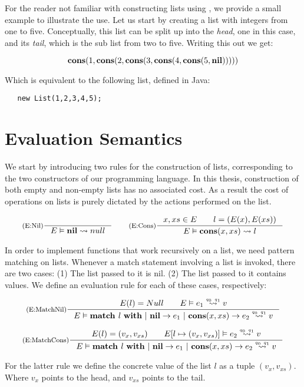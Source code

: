 For the reader not familiar with constructing lists using , we provide a small example to illustrate the use. Let us start by creating a list with integers from one to five. Conceptually, this list can be split up into the \emph{head}, one in this case, and its \emph{tail}, which is the sub list from two to five. Writing this out we get:

\[
   \textbf{cons}(1, \textbf{cons}(2, \textbf{cons}(3, \textbf{cons}(4, \textbf{cons}(5, \textbf{nil})))))
\]

Which is equivalent to the following list, defined in Java:

\begin{verbatim}
   new List(1,2,3,4,5);
\end{verbatim}

\section{Evaluation Semantics}

We start by introducing two rules for the construction of lists, corresponding to the two constructors of our programming language. In this thesis, construction of both empty and non-empty lists has no associated cost. As a result the cost of operations on lists is purely dictated by the actions performed on the list. 

\[
   \inference[(E:Nil)]
   {}
   {\evals{E}{\listnil}{null}{}{}}
   \qquad
   \inference[(E:Cons)]
   {\contains{E}{x, xs} \qquad l = (E(x), E(xs))}
   {\evals{E}{\cons{x}{xs}}{l}{}{}}
\]

In order to implement functions that work recursively on a list, we need pattern matching on lists. Whenever a match statement involving a list is invoked, there are two cases: (1) The list passed to it is nil. (2) The list passed to it contains values. We define an evaluation rule for each of these cases, respectively:

\[
   \inference[(E:MatchNil)]
   {E(l) = Null \qquad \evals{E}{e_1}{v}{q_0}{q_1}}
   {\evals{E}{\listmatch{l}{e_1}{e_2}}{v}{q_0}{q_1}}
\]

\[
   \inference[(E:MatchCons)]
   {E(l) = (v_x, v_{xs}) \qquad \evals{\envaugment{E}{l}{(v_x, v_{xs})}}{e_2}{v}{q_0}{q_1}}
   {\evals{E}{\listmatch{l}{e_1}{e_2}}{v}{q_0}{q_1}}
\]

For the latter rule we define the concrete value of the list \(l\) as a tuple \((v_x, v_{xs})\). Where \(v_x\) points to the head, and \(v_{xs}\) points to the tail. 

